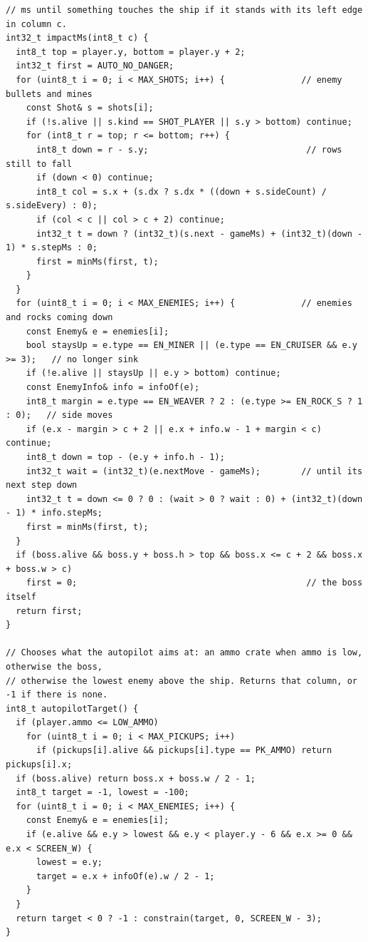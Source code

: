 \documentclass[11pt,a4paper]{article}
\begin{document}
\begin{lstlisting}[language=Arduino]
// ms until something touches the ship if it stands with its left edge in column c.
int32_t impactMs(int8_t c) {
  int8_t top = player.y, bottom = player.y + 2;
  int32_t first = AUTO_NO_DANGER;
  for (uint8_t i = 0; i < MAX_SHOTS; i++) {               // enemy bullets and mines
    const Shot& s = shots[i];
    if (!s.alive || s.kind == SHOT_PLAYER || s.y > bottom) continue;
    for (int8_t r = top; r <= bottom; r++) {
      int8_t down = r - s.y;                               // rows still to fall
      if (down < 0) continue;
      int8_t col = s.x + (s.dx ? s.dx * ((down + s.sideCount) / s.sideEvery) : 0);
      if (col < c || col > c + 2) continue;
      int32_t t = down ? (int32_t)(s.next - gameMs) + (int32_t)(down - 1) * s.stepMs : 0;
      first = minMs(first, t);
    }
  }
  for (uint8_t i = 0; i < MAX_ENEMIES; i++) {             // enemies and rocks coming down
    const Enemy& e = enemies[i];
    bool staysUp = e.type == EN_MINER || (e.type == EN_CRUISER && e.y >= 3);   // no longer sink
    if (!e.alive || staysUp || e.y > bottom) continue;
    const EnemyInfo& info = infoOf(e);
    int8_t margin = e.type == EN_WEAVER ? 2 : (e.type >= EN_ROCK_S ? 1 : 0);   // side moves
    if (e.x - margin > c + 2 || e.x + info.w - 1 + margin < c) continue;
    int8_t down = top - (e.y + info.h - 1);
    int32_t wait = (int32_t)(e.nextMove - gameMs);        // until its next step down
    int32_t t = down <= 0 ? 0 : (wait > 0 ? wait : 0) + (int32_t)(down - 1) * info.stepMs;
    first = minMs(first, t);
  }
  if (boss.alive && boss.y + boss.h > top && boss.x <= c + 2 && boss.x + boss.w > c)
    first = 0;                                             // the boss itself
  return first;
}

// Chooses what the autopilot aims at: an ammo crate when ammo is low, otherwise the boss,
// otherwise the lowest enemy above the ship. Returns that column, or -1 if there is none.
int8_t autopilotTarget() {
  if (player.ammo <= LOW_AMMO)
    for (uint8_t i = 0; i < MAX_PICKUPS; i++)
      if (pickups[i].alive && pickups[i].type == PK_AMMO) return pickups[i].x;
  if (boss.alive) return boss.x + boss.w / 2 - 1;
  int8_t target = -1, lowest = -100;
  for (uint8_t i = 0; i < MAX_ENEMIES; i++) {
    const Enemy& e = enemies[i];
    if (e.alive && e.y > lowest && e.y < player.y - 6 && e.x >= 0 && e.x < SCREEN_W) {
      lowest = e.y;
      target = e.x + infoOf(e).w / 2 - 1;
    }
  }
  return target < 0 ? -1 : constrain(target, 0, SCREEN_W - 3);
}


\end{lstlisting}
\end{document}
